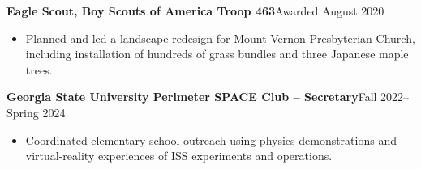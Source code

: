 \documentclass[10pt,a4paper]{article}
\newcommand{\entry}[2]{%
  \par\vspace{2pt}%
  \noindent\textbf{#1}\hfill#2\par
}
\newenvironment{items}
  {\begin{itemize}[leftmargin=1.2em,itemsep=0.6pt,topsep=1.5pt,parsep=0pt,
                   label=\textbullet]}
  {\end{itemize}}
\begin{document}
\entry{Eagle Scout, Boy Scouts of America Troop 463}{Awarded August 2020}
\begin{items}
  \item Planned and led a landscape redesign for Mount Vernon Presbyterian Church,
        including installation of hundreds of grass bundles and three Japanese maple trees.
\end{items}

\entry{Georgia State University Perimeter SPACE Club -- Secretary}{Fall 2022--Spring 2024}
\begin{items}
  \item Coordinated elementary-school outreach using physics demonstrations and
        virtual-reality experiences of ISS experiments and operations.
\end{items}
\end{document}
